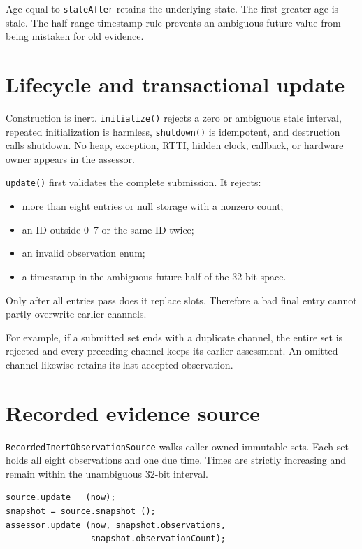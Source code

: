 \documentclass[11pt]{article}
\begin{document}
Age equal to \texttt{staleAfter} retains the underlying state. The first
greater age is stale. The half-range timestamp rule prevents an ambiguous
future value from being mistaken for old evidence.

\section{Lifecycle and transactional update}

Construction is inert. \texttt{initialize()} rejects a zero or ambiguous stale
interval, repeated initialization is harmless, \texttt{shutdown()} is
idempotent, and destruction calls shutdown. No heap, exception, RTTI, hidden
clock, callback, or hardware owner appears in the assessor.

\texttt{update()} first validates the complete submission. It rejects:

\begin{itemize}
  \item more than eight entries or null storage with a nonzero count;
  \item an ID outside 0--7 or the same ID twice;
  \item an invalid observation enum;
  \item a timestamp in the ambiguous future half of the 32-bit space.
\end{itemize}

Only after all entries pass does it replace slots. Therefore a bad final entry
cannot partly overwrite earlier channels.

For example, if a submitted set ends with a duplicate channel, the entire set
is rejected and every preceding channel keeps its earlier assessment. An
omitted channel likewise retains its last accepted observation.

\section{Recorded evidence source}

\texttt{RecordedInertObservationSource} walks caller-owned immutable sets.
Each set holds all eight observations and one due time. Times are strictly
increasing and remain within the unambiguous 32-bit interval.

\begin{lstlisting}[style=adkcpp]
source.update   (now);
snapshot = source.snapshot ();
assessor.update (now, snapshot.observations,
                 snapshot.observationCount);
\end{lstlisting}
\end{document}
